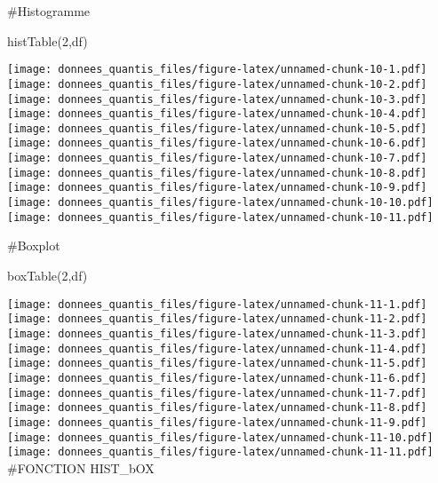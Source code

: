 \documentclass[
]{article}
\newenvironment{Shaded}{\begin{snugshade}}{\end{snugshade}}
\newcommand{\DecValTok}[1]{\textcolor[rgb]{0.00,0.00,0.81}{#1}}
\newcommand{\FunctionTok}[1]{\textcolor[rgb]{0.00,0.00,0.00}{#1}}
\newcommand{\NormalTok}[1]{#1}
\begin{document}
\#Histogramme

\begin{Shaded}
\begin{Highlighting}[]
\FunctionTok{histTable}\NormalTok{(}\DecValTok{2}\NormalTok{,df)}
\end{Highlighting}
\end{Shaded}

\texttt{[image: donnees\_quantis\_files/figure-latex/unnamed-chunk-10-1.pdf]}
\texttt{[image: donnees\_quantis\_files/figure-latex/unnamed-chunk-10-2.pdf]}
\texttt{[image: donnees\_quantis\_files/figure-latex/unnamed-chunk-10-3.pdf]}
\texttt{[image: donnees\_quantis\_files/figure-latex/unnamed-chunk-10-4.pdf]}
\texttt{[image: donnees\_quantis\_files/figure-latex/unnamed-chunk-10-5.pdf]}
\texttt{[image: donnees\_quantis\_files/figure-latex/unnamed-chunk-10-6.pdf]}
\texttt{[image: donnees\_quantis\_files/figure-latex/unnamed-chunk-10-7.pdf]}
\texttt{[image: donnees\_quantis\_files/figure-latex/unnamed-chunk-10-8.pdf]}
\texttt{[image: donnees\_quantis\_files/figure-latex/unnamed-chunk-10-9.pdf]}
\texttt{[image: donnees\_quantis\_files/figure-latex/unnamed-chunk-10-10.pdf]}
\texttt{[image: donnees\_quantis\_files/figure-latex/unnamed-chunk-10-11.pdf]}

\#Boxplot

\begin{Shaded}
\begin{Highlighting}[]
\FunctionTok{boxTable}\NormalTok{(}\DecValTok{2}\NormalTok{,df)}
\end{Highlighting}
\end{Shaded}

\texttt{[image: donnees\_quantis\_files/figure-latex/unnamed-chunk-11-1.pdf]}
\texttt{[image: donnees\_quantis\_files/figure-latex/unnamed-chunk-11-2.pdf]}
\texttt{[image: donnees\_quantis\_files/figure-latex/unnamed-chunk-11-3.pdf]}
\texttt{[image: donnees\_quantis\_files/figure-latex/unnamed-chunk-11-4.pdf]}
\texttt{[image: donnees\_quantis\_files/figure-latex/unnamed-chunk-11-5.pdf]}
\texttt{[image: donnees\_quantis\_files/figure-latex/unnamed-chunk-11-6.pdf]}
\texttt{[image: donnees\_quantis\_files/figure-latex/unnamed-chunk-11-7.pdf]}
\texttt{[image: donnees\_quantis\_files/figure-latex/unnamed-chunk-11-8.pdf]}
\texttt{[image: donnees\_quantis\_files/figure-latex/unnamed-chunk-11-9.pdf]}
\texttt{[image: donnees\_quantis\_files/figure-latex/unnamed-chunk-11-10.pdf]}
\texttt{[image: donnees\_quantis\_files/figure-latex/unnamed-chunk-11-11.pdf]}
\#FONCTION HIST\_bOX
\end{document}
